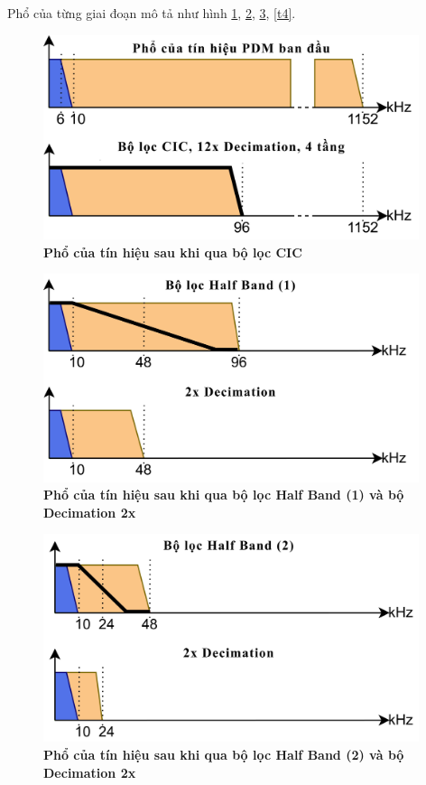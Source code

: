  \noindent Phổ của từng giai đoạn mô tả như hình \ref{t1}, \ref{t2}, \ref{t3}, \ref{t4}.
 \begin{figure}[H]
    \centering
    \includegraphics[width=11cm]{Images/Chuong3/1.png}
    \caption[Phổ của tín hiệu sau khi qua bộ lọc CIC]{\bfseries \fontsize{12pt}{0pt}\selectfont Phổ của tín hiệu sau khi qua bộ lọc CIC}
    \label{t1}
\end{figure}
\begin{figure}[H]
    \centering
    \includegraphics[width=11cm]{Images/Chuong3/2.png}
    \caption[Phổ của tín hiệu sau khi qua bộ lọc Half Band (1) và bộ Decimation 2x]{\bfseries \fontsize{12pt}{0pt}\selectfont Phổ của tín hiệu sau khi qua bộ lọc Half Band (1) và bộ Decimation 2x}
    \label{t2}
\end{figure}
\begin{figure}[H]
    \centering
    \includegraphics[width=11cm]{Images/Chuong3/3.png}
    \caption[Phổ của tín hiệu sau khi qua bộ lọc Half Band (2) và bộ Decimation 2x]{\bfseries \fontsize{12pt}{0pt}\selectfont Phổ của tín hiệu sau khi qua bộ lọc Half Band (2) và bộ Decimation 2x}
    \label{t3}
\end{figure}
